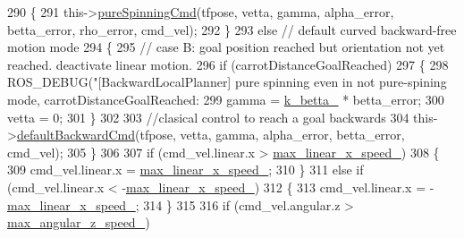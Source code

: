 \begin{DoxyCode}
290                 \{
291                     this->\hyperlink{classcl__move__base__z_1_1backward__local__planner_1_1BackwardLocalPlanner_aaa88a0a47e7cfd449c59518577599928}{pureSpinningCmd}(tfpose, vetta, gamma, alpha\_error, betta\_error, 
      rho\_error, cmd\_vel);
292                 \}
293                 \textcolor{keywordflow}{else} \textcolor{comment}{// default curved backward-free motion mode}
294                 \{
295                     \textcolor{comment}{// case B: goal position reached but orientation not yet reached. deactivate linear
       motion.}
296                     \textcolor{keywordflow}{if} (carrotDistanceGoalReached)
297                     \{
298                         ROS\_DEBUG(\textcolor{stringliteral}{"[BackwardLocalPlanner] pure spinning even in not pure-spining mode,
       carrotDistanceGoalReached: %
299                         gamma = \hyperlink{classcl__move__base__z_1_1backward__local__planner_1_1BackwardLocalPlanner_a9f257183d87f1d732cb7e404f09905ad}{k\_betta\_} * betta\_error;
300                         vetta = 0;
301                     \}
302 
303                     \textcolor{comment}{//clasical control to reach a goal backwards}
304                     this->\hyperlink{classcl__move__base__z_1_1backward__local__planner_1_1BackwardLocalPlanner_a1ebd69a028a22e3573e98f89d593f97d}{defaultBackwardCmd}(tfpose, vetta, gamma, alpha\_error, 
      betta\_error, cmd\_vel);
305                 \}
306 
307                 \textcolor{keywordflow}{if} (cmd\_vel.linear.x > \hyperlink{classcl__move__base__z_1_1backward__local__planner_1_1BackwardLocalPlanner_ae4399072e9ae9cc60d8837860dc4807b}{max\_linear\_x\_speed\_})
308                 \{
309                     cmd\_vel.linear.x = \hyperlink{classcl__move__base__z_1_1backward__local__planner_1_1BackwardLocalPlanner_ae4399072e9ae9cc60d8837860dc4807b}{max\_linear\_x\_speed\_};
310                 \}
311                 \textcolor{keywordflow}{else} \textcolor{keywordflow}{if} (cmd\_vel.linear.x < -\hyperlink{classcl__move__base__z_1_1backward__local__planner_1_1BackwardLocalPlanner_ae4399072e9ae9cc60d8837860dc4807b}{max\_linear\_x\_speed\_})
312                 \{
313                     cmd\_vel.linear.x = -\hyperlink{classcl__move__base__z_1_1backward__local__planner_1_1BackwardLocalPlanner_ae4399072e9ae9cc60d8837860dc4807b}{max\_linear\_x\_speed\_};
314                 \}
315 
316                 \textcolor{keywordflow}{if} (cmd\_vel.angular.z > \hyperlink{classcl__move__base__z_1_1backward__local__planner_1_1BackwardLocalPlanner_af7e492339ee2d1c90c00f6dd4cf95551}{max\_angular\_z\_speed\_})
}
\end{DoxyCode}
